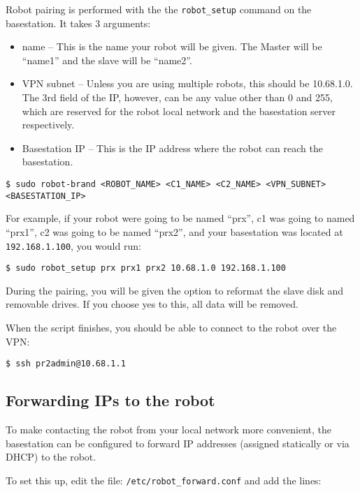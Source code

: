 Robot pairing is performed with the the \texttt{robot\_setup} command
on the basestation.  It takes 3 arguments:

\begin{itemize}
\item name -- This is the name your robot will be given.  The Master will be ``name1'' and the slave will be ``name2''.
\item VPN subnet -- Unless you are using multiple robots, this should be 10.68.1.0.  The 3rd field of the IP, however, can be any value other than 0 and 255, which are reserved for the robot local network and the basestation server respectively.
\item Basestation IP -- This is the IP address where the robot can reach the basestation.
\end{itemize}


\begin{verbatim}
$ sudo robot-brand <ROBOT_NAME> <C1_NAME> <C2_NAME> <VPN_SUBNET> <BASESTATION_IP>
\end{verbatim}

For example, if your robot were going to be named ``prx'', c1 was going to named ``prx1'', c2 was going to be named ``prx2'', and your basestation was located at \texttt{192.168.1.100}, you would run:

\begin{verbatim}
$ sudo robot_setup prx prx1 prx2 10.68.1.0 192.168.1.100
\end{verbatim}

During the pairing, you will be given the option to reformat the slave
disk and removable drives.  If you choose yes to this, all data will
be removed.

When the script finishes, you should be able to connect to the robot over the VPN:

\begin{verbatim}
$ ssh pr2admin@10.68.1.1
\end{verbatim}

\subsection{Forwarding IPs to the robot}

To make contacting the robot from your local network more convenient,
the basestation can be configured to forward IP addresses (assigned
statically or via DHCP) to the robot.

To set this up, edit the file: \texttt{/etc/robot\_forward.conf} and add the lines:

